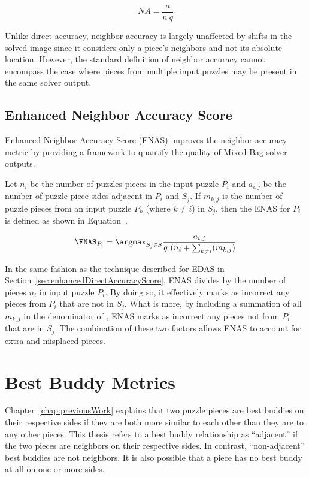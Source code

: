 \begin{equation} \label{eq:neighborAccuracy}
NA = \frac{a}{n~q}
\end{equation}

Unlike direct accuracy, neighbor accuracy is largely unaffected by shifts in the solved image since it considers only a piece's neighbors and not its absolute location.  However, the standard definition of neighbor accuracy cannot encompass the case where pieces from multiple input puzzles may be present in the same solver output.  

\subsection{Enhanced Neighbor Accuracy Score}\label{sec:enhancedNeighborAccuracyScore}

Enhanced Neighbor Accuracy Score (ENAS) improves the neighbor accuracy metric by providing a framework to quantify the quality of Mixed-Bag solver outputs. 

Let $n_i$ be the number of puzzles pieces in the input puzzle $P_i$ and $a_{i,j}$ be the number of puzzle piece sides adjacent in $P_i$ and $S_j$.  If $m_{k,j}$ is the number of puzzle pieces from an input puzzle $P_k$ (where $k \ne i$) in $S_j$, then the ENAS for $P_i$ is defined as shown in Equation~.

\begin{equation} \label{eq:enhancedNeighborAccuracyScore}
\ENAS_{P_i} = \argmax_{S_j \in S}\frac{a_{i,j}}{q ~ (n_i + \sum_{k \ne i}(m_{k,j})}
\end{equation}

In the same fashion as the technique described for EDAS in Section~\ref{sec:enhancedDirectAccuracyScore}, ENAS divides by the number of pieces $n_i$ in input puzzle $P_i$.  By doing so, it effectively marks as incorrect any pieces from $P_i$ that are not in $S_j$.  What is more, by including a summation of all $m_{k,j}$ in the denominator of , ENAS marks as incorrect any pieces not from $P_i$ that are in $S_j$.  The combination of these two factors allows ENAS to account for extra and misplaced pieces.

\section{Best Buddy Metrics}\label{sec:bestBuddyMetrics}

Chapter~\ref{chap:previousWork} explains that two puzzle pieces are best buddies on their respective sides if they are both more similar to each other than they are to any other pieces.  This thesis refers to a best buddy relationship as ``adjacent'' if the two pieces are neighbors on their respective sides.  In contrast, ``non-adjacent'' best buddies are not neighbors.  It is also possible that a piece has no best buddy at all on one or more sides.

